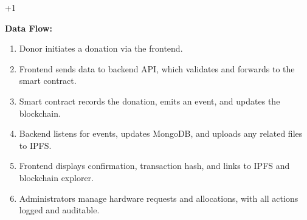 +1\documentclass[conference]{IEEEtran}
\begin{document}
\textbf{Data Flow:}
\begin{enumerate}
    \item Donor initiates a donation via the frontend.
    \item Frontend sends data to backend API, which validates and forwards to the smart contract.
    \item Smart contract records the donation, emits an event, and updates the blockchain.
    \item Backend listens for events, updates MongoDB, and uploads any related files to IPFS.
    \item Frontend displays confirmation, transaction hash, and links to IPFS and blockchain explorer.
    \item Administrators manage hardware requests and allocations, with all actions logged and auditable.
\end{enumerate}
\end{document}

